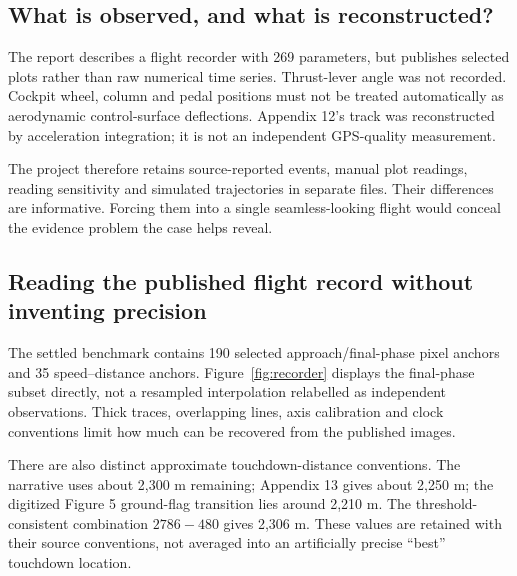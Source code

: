 \subsection*{What is observed, and what is reconstructed?}
The report describes a flight recorder with 269 parameters, but publishes selected plots rather than raw numerical time series. Thrust-lever angle was not recorded. Cockpit wheel, column and pedal positions must not be treated automatically as aerodynamic control-surface deflections. Appendix 12's track was reconstructed by acceleration integration; it is not an independent GPS-quality measurement.

The project therefore retains source-reported events, manual plot readings, reading sensitivity and simulated trajectories in separate files. Their differences are informative. Forcing them into a single seamless-looking flight would conceal the evidence problem the case helps reveal.
\clearpage
\subsection*{Reading the published flight record without inventing precision}

The settled benchmark contains 190 selected approach/final-phase pixel anchors and 35 speed--distance anchors. Figure~\ref{fig:recorder} displays the final-phase subset directly, not a resampled interpolation relabelled as independent observations. Thick traces, overlapping lines, axis calibration and clock conventions limit how much can be recovered from the published images.

There are also distinct approximate touchdown-distance conventions. The narrative uses about 2,300 m remaining; Appendix 13 gives about 2,250 m; the digitized Figure 5 ground-flag transition lies around 2,210 m. The threshold-consistent combination $2786-480$ gives 2,306 m. These values are retained with their source conventions, not averaged into an artificially precise ``best'' touchdown location.


